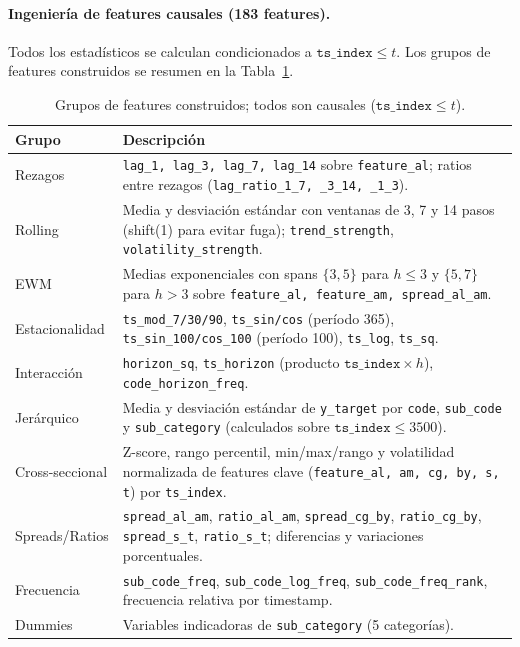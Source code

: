 \documentclass{article}
\begin{document}
\paragraph{Ingeniería de features causales (183 features).}
Todos los estadísticos se calculan condicionados a $\texttt{ts\_index} \leq t$. Los grupos de features construidos se resumen en la Tabla~\ref{tab:feat_groups}.

\begin{table}[h!]
  \caption{Grupos de features construidos; todos son causales ($\texttt{ts\_index} \leq t$).}
  \label{tab:feat_groups}
  \centering
  \begin{tabular}{lp{7.5cm}}
    \toprule
    Grupo & Descripción \\
    \midrule
    Rezagos            & \texttt{lag\_1, lag\_3, lag\_7, lag\_14} sobre \texttt{feature\_al}; ratios entre rezagos (\texttt{lag\_ratio\_1\_7, \_3\_14, \_1\_3}). \\
    Rolling            & Media y desviación estándar con ventanas de 3, 7 y 14 pasos (shift(1) para evitar fuga); \texttt{trend\_strength}, \texttt{volatility\_strength}. \\
    EWM                & Medias exponenciales con spans $\{3,5\}$ para $h \leq 3$ y $\{5,7\}$ para $h > 3$ sobre \texttt{feature\_al, feature\_am, spread\_al\_am}. \\
    Estacionalidad     & \texttt{ts\_mod\_7/30/90}, \texttt{ts\_sin/cos} (período 365), \texttt{ts\_sin\_100/cos\_100} (período 100), \texttt{ts\_log}, \texttt{ts\_sq}. \\
    Interacción        & \texttt{horizon\_sq}, \texttt{ts\_horizon} (producto $\texttt{ts\_index} \times h$), \texttt{code\_horizon\_freq}. \\
    Jerárquico         & Media y desviación estándar de \texttt{y\_target} por \texttt{code}, \texttt{sub\_code} y \texttt{sub\_category} (calculados sobre $\texttt{ts\_index} \leq 3500$). \\
    Cross-seccional    & Z-score, rango percentil, min/max/rango y volatilidad normalizada de features clave (\texttt{feature\_al, am, cg, by, s, t}) por \texttt{ts\_index}. \\
    Spreads/Ratios     & \texttt{spread\_al\_am}, \texttt{ratio\_al\_am}, \texttt{spread\_cg\_by}, \texttt{ratio\_cg\_by}, \texttt{spread\_s\_t}, \texttt{ratio\_s\_t}; diferencias y variaciones porcentuales. \\
    Frecuencia         & \texttt{sub\_code\_freq}, \texttt{sub\_code\_log\_freq}, \texttt{sub\_code\_freq\_rank}, frecuencia relativa por timestamp. \\
    Dummies            & Variables indicadoras de \texttt{sub\_category} (5 categorías). \\
    \bottomrule
  \end{tabular}
\end{table}
\end{document}

